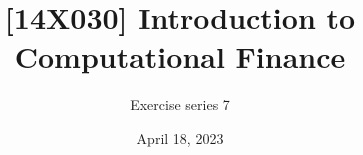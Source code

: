 \documentclass[12pt]{article}
\title{[14X030] Introduction to Computational Finance}
\author{Exercise series 7}
\date{\small April 18, 2023}
\begin{document}
 

\maketitle 




\vfill



\vfill
\end{document}
